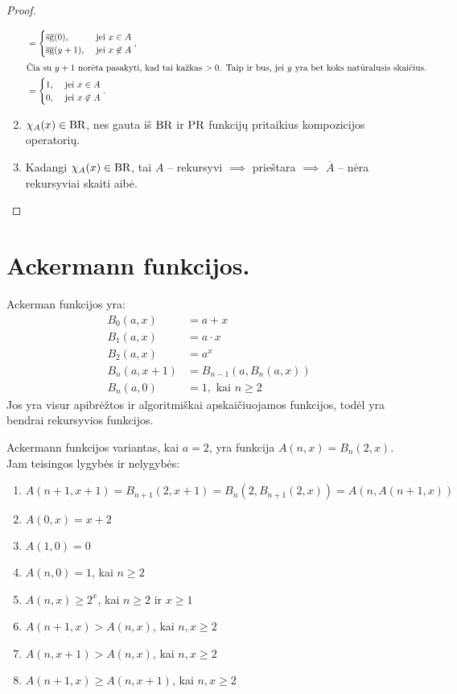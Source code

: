 \begin{prop}
\begin{proof}
\begin{enumerate}
\begin{align*}
          &=%
          \begin{cases}
            \sgi(0), & \text{ jei } x \in A \\
            \sgi(y+1), & \text{ jei } x \not \in A
          \end{cases},\\
          \intertext{%
            Čia su $y+1$ norėta pasakyti, kad tai kažkas $> 0$. Taip ir
            bus, jei $y$ yra bet koks natūralusis skaičius.
          }
          &=%
          \begin{cases}
            1, & \text{ jei } x \in A \\
            0, & \text{ jei } x \not \in A
          \end{cases}.
        \end{align*}
      \item $\chi_{A}(x) \in \mathop{\text{BR}}$, nes gauta iš $\mathop{\text{BR}}$ ir $\mathop{\text{PR}}$ funkcijų
        pritaikius kompozicijos operatorių.
      \item Kadangi $\chi_{A}(x) \in \mathop{\text{BR}}$, tai $A$ – rekursyvi 
        $\implies$ prieštara $\implies$ $\overline{A}$ – nėra rekursyviai
        skaiti aibė.
    \end{enumerate}
  \end{proof}
\end{prop}

\section{Ackermann funkcijos.}

Ackerman funkcijos yra:
\begin{align*}
  B_{0}(a, x) &= a + x \\
  B_{1}(a, x) &= a \cdot x \\
  B_{2}(a, x) &= a^{x} \\
  B_{n}(a, x+1) &= B_{n-1}(a, B_{n}(a, x)) \\
  B_{n}(a, 0) &= 1, \text{ kai } n \geq 2
\end{align*}
Jos yra visur apibrėžtos ir algoritmiškai apskaičiuojamos funkcijos, todėl
yra bendrai rekursyvios funkcijos.

Ackermann funkcijos variantas, kai $a=2$, yra funkcija 
$A(n,x) = B_{n}(2, x)$. Jam teisingos lygybės ir nelygybės:
\begin{enumerate}
  \item $A(n+1,x+1) = B_{n+1}(2, x+1) = B_{n}(2, B_{n+1}(2, x)) = %
    A(n, A(n+1, x))$
  \item $A(0,x) = x+2$
  \item $A(1,0) = 0$
  \item $A(n,0) = 1$, kai $n \geq 2$
  \item $A(n,x) \geq 2^{x}$, kai $n \geq 2$ ir $x \geq 1$
  \item $A(n+1,x) > A(n,x)$, kai $n,x \geq 2$
  \item $A(n,x+1) > A(n,x)$, kai $n,x \geq 2$
  \item $A(n+1,x) \geq A(n,x+1)$, kai $n,x \geq 2$
\end{enumerate}

